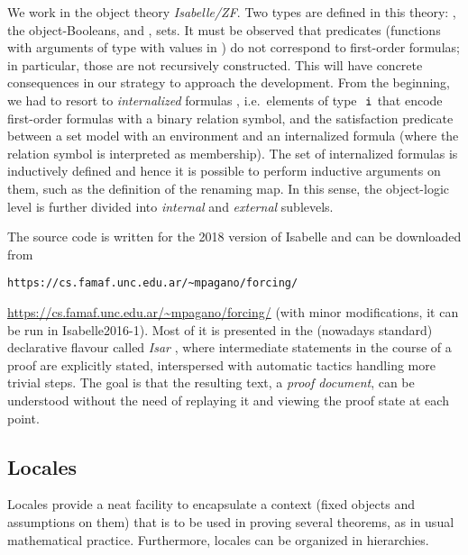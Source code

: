 We work in the object theory \emph{Isabelle/ZF}. Two types are defined
in this theory: \tyo, the object-Booleans, and \tyi,
sets. 
It must be observed that predicates (functions with arguments of
type \tyi{} with values in \tyo) do not correspond to first-order formulas;
in particular, those are not recursively constructed.
This will
have concrete consequences in our strategy to approach the
development. From the beginning, we had to resort to
\emph{internalized} formulas \cite[Sect.~6]{paulson_2003}, i.e.\ elements of type $\tyi$ that
encode first-order formulas with a binary relation symbol, and the
satisfaction predicate  between a set
model with an environment and an internalized formula (where the
relation symbol is interpreted as membership). The set 
 of internalized
formulas is inductively defined and hence it is possible to perform
inductive arguments on them, such as the definition of the renaming map. In this sense, the object-logic level
is further divided into \emph{internal} and \emph{external}
sublevels. 

The source code is written for the 2018 version of Isabelle and can be downloaded
from 
\ifIEEE
\begin{center}
\texttt{https://cs.famaf.unc.edu.ar/\~{}mpagano/forcing/}
\end{center}
\fi
\ifarXiv
\url{https://cs.famaf.unc.edu.ar/~mpagano/forcing/}
\fi
(with
minor modifications, it can be run in Isabelle2016-1). Most of it is
presented in the (nowadays standard) declarative flavour called
\emph{Isar} \cite{DBLP:conf/tphol/Wenzel99}, where intermediate
statements in the course of a proof are explicitly stated,
interspersed with automatic tactics handling more trivial steps. The
goal is that the resulting text, a \emph{proof document}, can be
understood without the need of replaying it and viewing the proof state
at each point.

\subsection{Locales}
\label{sec:locales}
Locales \cite{ballarin2010tutorial} provide a neat facility to
encapsulate a context (fixed objects and assumptions on them) that is
to be used in proving several theorems, as in usual mathematical
practice. Furthermore, locales can be organized in hierarchies. 

